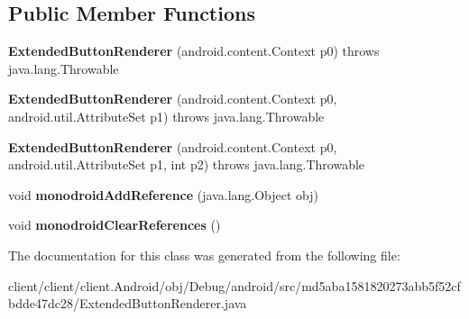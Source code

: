 \subsection*{Public Member Functions}
\begin{DoxyCompactItemize}
\item 
\hypertarget{classmd5aba1581820273abb5f52cfbdde47dc28_1_1ExtendedButtonRenderer_a76a1854f81dbc8e240e6a12e5633a9a6}{}{\bfseries Extended\+Button\+Renderer} (android.\+content.\+Context p0)  throws java.\+lang.\+Throwable 	\label{classmd5aba1581820273abb5f52cfbdde47dc28_1_1ExtendedButtonRenderer_a76a1854f81dbc8e240e6a12e5633a9a6}

\item 
\hypertarget{classmd5aba1581820273abb5f52cfbdde47dc28_1_1ExtendedButtonRenderer_a20981db7477d7800de836481b3305e5d}{}{\bfseries Extended\+Button\+Renderer} (android.\+content.\+Context p0, android.\+util.\+Attribute\+Set p1)  throws java.\+lang.\+Throwable 	\label{classmd5aba1581820273abb5f52cfbdde47dc28_1_1ExtendedButtonRenderer_a20981db7477d7800de836481b3305e5d}

\item 
\hypertarget{classmd5aba1581820273abb5f52cfbdde47dc28_1_1ExtendedButtonRenderer_abed82703ad29bf1d5d5a7e8421ea39bc}{}{\bfseries Extended\+Button\+Renderer} (android.\+content.\+Context p0, android.\+util.\+Attribute\+Set p1, int p2)  throws java.\+lang.\+Throwable 	\label{classmd5aba1581820273abb5f52cfbdde47dc28_1_1ExtendedButtonRenderer_abed82703ad29bf1d5d5a7e8421ea39bc}

\item 
\hypertarget{classmd5aba1581820273abb5f52cfbdde47dc28_1_1ExtendedButtonRenderer_aa6b560b754c71d2693a2a3009bdf5926}{}void {\bfseries monodroid\+Add\+Reference} (java.\+lang.\+Object obj)\label{classmd5aba1581820273abb5f52cfbdde47dc28_1_1ExtendedButtonRenderer_aa6b560b754c71d2693a2a3009bdf5926}

\item 
\hypertarget{classmd5aba1581820273abb5f52cfbdde47dc28_1_1ExtendedButtonRenderer_ad55bacb9a59be9bdf80a8a77e699f3ad}{}void {\bfseries monodroid\+Clear\+References} ()\label{classmd5aba1581820273abb5f52cfbdde47dc28_1_1ExtendedButtonRenderer_ad55bacb9a59be9bdf80a8a77e699f3ad}

\end{DoxyCompactItemize}


The documentation for this class was generated from the following file\+:\begin{DoxyCompactItemize}
\item 
client/client/client.\+Android/obj/\+Debug/android/src/md5aba1581820273abb5f52cfbdde47dc28/Extended\+Button\+Renderer.\+java\end{DoxyCompactItemize}
